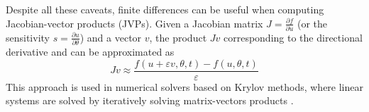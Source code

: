 Despite all these caveats, finite differences can be useful when computing Jacobian-vector products (JVPs). 
Given a Jacobian matrix $J = \frac{\partial f}{\partial u}$ (or the sensitivity $s = \frac{\partial u}{\partial \theta}$) and a vector $v$, the product $Jv$ corresponding to the directional derivative and can be approximated as 
\begin{equation}
    Jv \approx \frac{f(u + \varepsilon v, \theta, t) - f(u, \theta, t)}{\varepsilon}
\end{equation}
This approach is used in numerical solvers based on Krylov methods, where linear systems are solved by iteratively solving matrix-vectors products \cite{Ipsen_Meyer_1998}.


